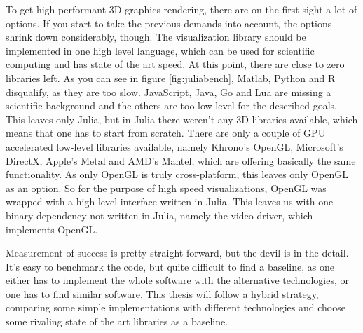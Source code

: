 To get high performant 3D graphics rendering, there are on the first sight a lot of options.
If you start to take the previous demands into account, the options shrink down considerably, though.
The visualization library should be implemented in one high level language, which can be used for scientific computing and has state of the art speed. At this point, there are close to zero libraries left. As you can see in figure \ref{fig:juliabench}, Matlab, Python and R disqualify, as they are too slow. JavaScript, Java, Go and Lua are missing a scientific background and the others are too low level for the described goals.
This leaves only Julia, but in Julia there weren't any 3D libraries available, which means that one has to start from scratch.
There are only a couple of GPU accelerated low-level libraries available, namely Khrono's \ac{OpenGL}, Microsoft's DirectX, Apple's Metal and AMD's Mantel, which are offering basically the same functionality. As only \ac{OpenGL} is truly cross-platform, this leaves only \ac{OpenGL} as an option.
So for the purpose of high speed visualizations, \ac{OpenGL} was wrapped with a high-level interface written in Julia. This leaves us with one binary dependency not written in Julia, namely the video driver, which implements \ac{OpenGL}.

Measurement of success is pretty straight forward, but the devil is in the detail.
It's easy to benchmark the code, but quite difficult to find a baseline, as one either has to implement the whole software with the alternative technologies, or one has to find similar software.
This thesis will follow a hybrid strategy, comparing some simple implementations with different technologies and choose some rivaling state of the art libraries as a baseline.

